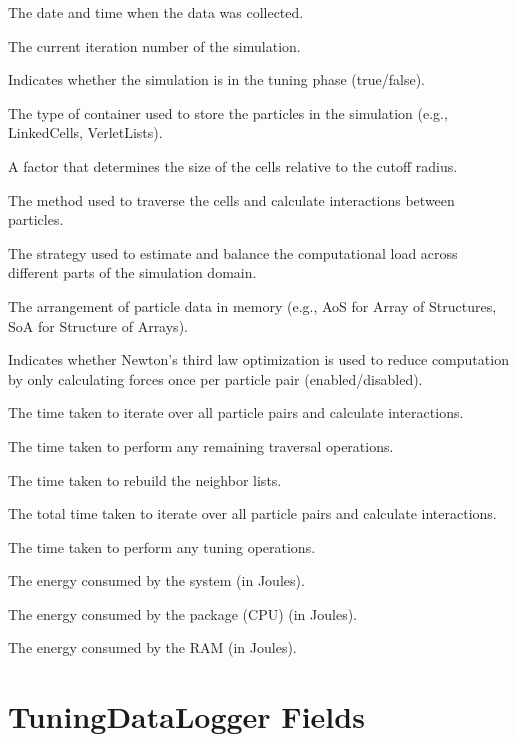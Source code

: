 \begin{description}[style=multiline, leftmargin =40mm]
  \item[Date] The date and time when the data was collected.
  \item[Iteration] The current iteration number of the simulation.
  \item[inTuningPhase] Indicates whether the simulation is in the tuning phase (true/false).
  \item[Container] The type of container used to store the particles in the simulation (e.g., LinkedCells, VerletLists).
  \item[CellSizeFactor] A factor that determines the size of the cells relative to the cutoff radius.
  \item[Traversal] The method used to traverse the cells and calculate interactions between particles.
  \item[Load Estimator] The strategy used to estimate and balance the computational load across different parts of the simulation domain.
  \item[Data Layout] The arrangement of particle data in memory (e.g., AoS for Array of Structures, SoA for Structure of Arrays).
  \item[Newton 3] Indicates whether Newton's third law optimization is used to reduce computation by only calculating forces once per particle pair (enabled/disabled).
  \item[iteratePairwise] The time taken to iterate over all particle pairs and calculate interactions.
  \item[remainderTraversal] The time taken to perform any remaining traversal operations.
  \item[rebuildNeighborLists] The time taken to rebuild the neighbor lists.
  \item[iteratePairwiseTotal] The total time taken to iterate over all particle pairs and calculate interactions.
  \item[tuning] The time taken to perform any tuning operations.
  \item[energyPsys] The energy consumed by the system (in Joules).
  \item[energyPkg] The energy consumed by the package (CPU) (in Joules).
  \item[energyRam] The energy consumed by the RAM (in Joules).
\end{description}


\section{TuningDataLogger Fields}
\label{des:tuningdatafields}

